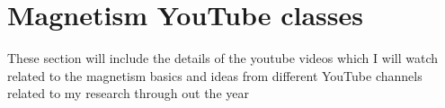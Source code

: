 \chapter{Magnetism YouTube classes}
\label{chap:Magnetism}


These section will include the details of the youtube videos which I will watch related to the magnetism basics and ideas from different YouTube channels related to my research through out the year


% 
% 
